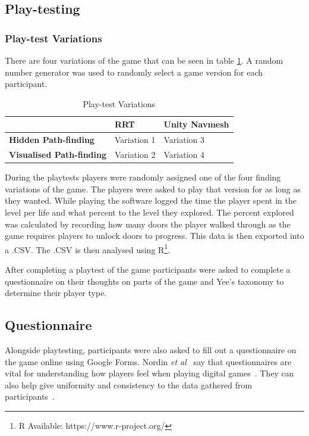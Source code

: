 \documentclass[journal]{IEEEtran}
\begin{document}
	\subsection{Play-testing}
	\subsubsection{Play-test Variations}
	There are four variations of the game that can be seen in table \ref{table:PlaytestVariations}.  A random number generator was used to randomly select a game version for each participant.
	
	\begin{table}[H]
		\centering
		\caption{Play-test Variations}
		\label{table:PlaytestVariations}
		\def\arraystretch{1.5}
		\begin{tabular}{ |l|l|l|}
			\hline
			& \textbf{RRT}& \textbf{Unity Navmesh} \\
			\hline
			\textbf{Hidden Path-finding}    & Variation 1            & Variation 3 \\
			\hline
			\textbf{Visualised Path-finding}& Variation 2              & Variation 4 \\
			\hline
		\end{tabular}
	\end{table}
	
	During the playtests players were randomly assigned one of the four finding variations of the game. The players were asked to play that version for as long as they wanted. While playing the software logged the time the player spent in the level per life and what percent to the level they explored. The percent explored was calculated by recording how many doors the player walked through as the game requires players to unlock doors to progress. This data is then exported into a .CSV. The .CSV is then analysed using R\footnote[2]{R Available: https://www.r-project.org/}.
	
	
	After completing a playtest of the game participants were asked to complete a questionnaire on their thoughts on parts of the game and Yee's taxonomy to determine their player type.
	
	\subsection{Questionnaire} \label{Questionnaire}
	
	Alongside playtesting, participants were also asked to fill out a questionnaire on the game online using Google Forms. Nordin \textit{et al}~\cite{nordin2014} say that questionnaires are vital for understanding how players feel when playing digital games~\cite{nordin2014,Denisova2016}. They can also help give uniformity and consistency to the data gathered from participants~\cite{Denisova2016}.
	
\end{document}
